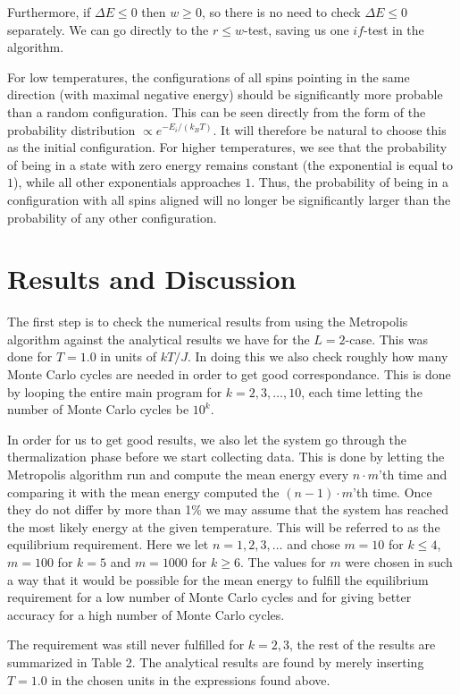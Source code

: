 \documentclass[english, 12pt]{article}
\begin{document}
Furthermore, if $\Delta E\leq 0$ then $w\geq0$, so there is no need to check $\Delta E\leq0$ separately. We can go directly to the $r\leq w$-test, saving us one $if$-test in the algorithm.

For low temperatures, the configurations of all spins pointing in the same direction (with maximal negative energy) should be significantly more probable than a random configuration. This can be seen directly from the form of the probability distribution $\propto e^{-E_i/(k_BT)}$. It will therefore be natural to choose this as the initial configuration. For higher temperatures, we see that the probability of being in a state with zero energy remains constant (the exponential is equal to $1$), while all other exponentials approaches $1$. Thus, the probability of being in a configuration with all spins aligned will no longer be significantly larger than the probability of any other configuration.

\section{Results and Discussion}

The first step is to check the numerical results from using the Metropolis algorithm against the analytical results we have for the $L=2$-case. This was done for $T=1.0$ in units of $kT/J$. In doing this we also check roughly how many Monte Carlo cycles are needed in order to get good correspondance. This is done by looping the entire main program for $k = 2,3,\dots,10$, each time letting the number of Monte Carlo cycles be $10^k$.

In order for us to get good results, we also let the system go through the thermalization phase before we start collecting data. This is done by letting the Metropolis algorithm run and compute the mean energy every $n\cdot m$'th time and comparing it with the mean energy computed the $(n-1)\cdot m$'th time. Once they do not differ by more than 1\% we may assume that the system has reached the most likely energy at the given temperature. This will be referred to as the equilibrium requirement. Here we let $n=1,2,3,\dots$ and chose $m=10$ for $k\leq 4$, $m=100$ for $k=5$ and $m=1000$ for $k\geq 6$. The values for $m$ were chosen in such a way that it would be possible for the mean energy to fulfill the equilibrium requirement for a low number of Monte Carlo cycles and for giving better accuracy for a high number of Monte Carlo cycles.

The requirement was still never fulfilled for $k=2,3$, the rest of the results are summarized in Table 2. The analytical results are found by merely inserting $T = 1.0$ in the chosen units in the expressions found above.
\end{document}
